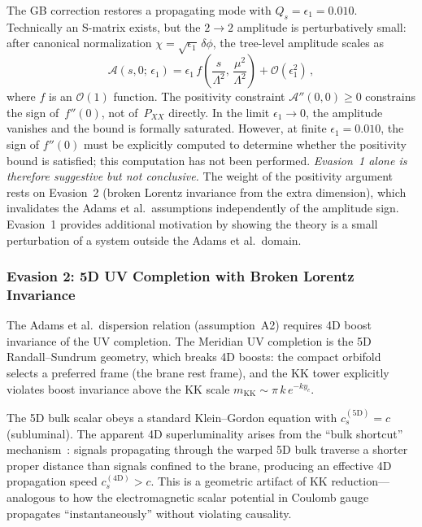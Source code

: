 The GB correction restores a propagating mode with $Q_s = \epsilon_1 = 0.010$. Technically an S-matrix exists, but the $2 \to 2$ amplitude is perturbatively small: after canonical normalization $\chi = \sqrt{\epsilon_1}\,\delta\phi$, the tree-level amplitude scales as
\begin{equation}
  \mathcal{A}(s, 0;\, \epsilon_1) = \epsilon_1\, f\!\left(\frac{s}{\Lambda^2},\, \frac{\mu^2}{\Lambda^2}\right) + \mathcal{O}(\epsilon_1^2)\,,
  \label{eq:5-amplitude-scaling}
\end{equation}
where $f$ is an $\mathcal{O}(1)$ function. The positivity constraint $\mathcal{A}''(0, 0) \geq 0$ constrains the sign of~$f''(0)$, not of~$P_{XX}$ directly. In the limit $\epsilon_1 \to 0$, the amplitude vanishes and the bound is formally saturated. However, at finite $\epsilon_1 = 0.010$, the sign of $f''(0)$ must be explicitly computed to determine whether the positivity bound is satisfied; this computation has not been performed. \emph{Evasion~1 alone is therefore suggestive but not conclusive.} The weight of the positivity argument rests on Evasion~2 (broken Lorentz invariance from the extra dimension), which invalidates the Adams et al.\ assumptions independently of the amplitude sign. Evasion~1 provides additional motivation by showing the theory is a small perturbation of a system outside the Adams et al.\ domain.

\subsubsection{Evasion 2: 5D UV Completion with Broken Lorentz Invariance}

The Adams et al.\ dispersion relation (assumption~A2) requires 4D boost invariance of the UV completion. The Meridian UV completion is the 5D Randall--Sundrum geometry, which breaks 4D boosts: the compact orbifold selects a preferred frame (the brane rest frame), and the KK tower explicitly violates boost invariance above the KK scale $m_{\mathrm{KK}} \sim \pi\, k\, e^{-ky_c}$.

The 5D bulk scalar obeys a standard Klein--Gordon equation with $c_s^{(\mathrm{5D})} = c$ (subluminal). The apparent 4D superluminality arises from the ``bulk shortcut'' mechanism~\cite{ch5:ChungFreese2000}: signals propagating through the warped 5D bulk traverse a shorter proper distance than signals confined to the brane, producing an effective 4D propagation speed $c_s^{(\mathrm{4D})} > c$. This is a geometric artifact of KK reduction---analogous to how the electromagnetic scalar potential in Coulomb gauge propagates ``instantaneously'' without violating causality.

